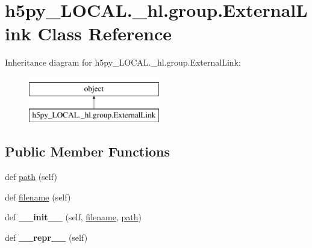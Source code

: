 \hypertarget{classh5py__LOCAL_1_1__hl_1_1group_1_1ExternalLink}{}\section{h5py\+\_\+\+L\+O\+C\+A\+L.\+\_\+hl.\+group.\+External\+Link Class Reference}
\label{classh5py__LOCAL_1_1__hl_1_1group_1_1ExternalLink}
Inheritance diagram for h5py\+\_\+\+L\+O\+C\+A\+L.\+\_\+hl.\+group.\+External\+Link\+:\begin{figure}[H]
\begin{center}
\leavevmode
\includegraphics[height=2.000000cm]{classh5py__LOCAL_1_1__hl_1_1group_1_1ExternalLink}
\end{center}
\end{figure}
\subsection*{Public Member Functions}
\begin{DoxyCompactItemize}
\item 
def \hyperlink{classh5py__LOCAL_1_1__hl_1_1group_1_1ExternalLink_a64bb6af7754a69a2393c0a70de4a6ec4}{path} (self)
\item 
def \hyperlink{classh5py__LOCAL_1_1__hl_1_1group_1_1ExternalLink_acad29e48406b698e19ff65b74ba7233b}{filename} (self)
\item 
\mbox{\label{classh5py__LOCAL_1_1__hl_1_1group_1_1ExternalLink_a33606540510b4eba732b9a2828b03dce}} 
def {\bfseries \+\_\+\+\_\+init\+\_\+\+\_\+} (self, \hyperlink{classh5py__LOCAL_1_1__hl_1_1group_1_1ExternalLink_acad29e48406b698e19ff65b74ba7233b}{filename}, \hyperlink{classh5py__LOCAL_1_1__hl_1_1group_1_1ExternalLink_a64bb6af7754a69a2393c0a70de4a6ec4}{path})
\item 
\mbox{\label{classh5py__LOCAL_1_1__hl_1_1group_1_1ExternalLink_ac553ada22aaae250b6de770f5d9f628e}} 
def {\bfseries \+\_\+\+\_\+repr\+\_\+\+\_\+} (self)
\end{DoxyCompactItemize}



